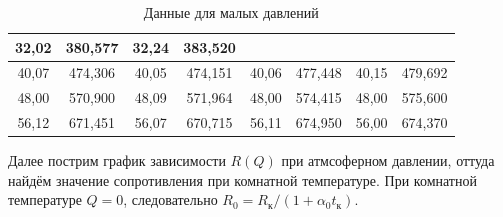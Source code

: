 \documentclass[a4paper,12pt]{article}
\begin{document}
\begin{table}[H]
\begin{tabular}{|cc|cc|cc|cc|}
          \multicolumn{1}{c|}{{\color[HTML]{000000} 32,02}} &
          {\color[HTML]{000000} 380,577} &
          \multicolumn{1}{c|}{{\color[HTML]{000000} 32,24}} &
          {\color[HTML]{000000} 383,520} \\ \hline
        \multicolumn{1}{|c|}{{\color[HTML]{000000} 40,07}} &
          {\color[HTML]{000000} 474,306} &
          \multicolumn{1}{c|}{{\color[HTML]{000000} 40,05}} &
          {\color[HTML]{000000} 474,151} &
          \multicolumn{1}{c|}{{\color[HTML]{000000} 40,06}} &
          {\color[HTML]{000000} 477,448} &
          \multicolumn{1}{c|}{{\color[HTML]{000000} 40,15}} &
          {\color[HTML]{000000} 479,692} \\ \hline
        \multicolumn{1}{|c|}{{\color[HTML]{000000} 48,00}} &
          {\color[HTML]{000000} 570,900} &
          \multicolumn{1}{c|}{{\color[HTML]{000000} 48,09}} &
          {\color[HTML]{000000} 571,964} &
          \multicolumn{1}{c|}{{\color[HTML]{000000} 48,00}} &
          {\color[HTML]{000000} 574,415} &
          \multicolumn{1}{c|}{{\color[HTML]{000000} 48,00}} &
          {\color[HTML]{000000} 575,600} \\ \hline
        \multicolumn{1}{|c|}{{\color[HTML]{000000} 56,12}} &
          {\color[HTML]{000000} 671,451} &
          \multicolumn{1}{c|}{{\color[HTML]{000000} 56,07}} &
          {\color[HTML]{000000} 670,715} &
          \multicolumn{1}{c|}{{\color[HTML]{000000} 56,11}} &
          {\color[HTML]{000000} 674,950} &
          \multicolumn{1}{c|}{{\color[HTML]{000000} 56,00}} &
          {\color[HTML]{000000} 674,370} \\ \hline
    \end{tabular}
    \caption*{Данные для малых давлений}
\end{table}
\newpage
Далее пострим график зависимости $R(Q)$ при атмсоферном давлении, оттуда найдём значение сопротивления при комнатной температуре. При комнатной температуре $Q = 0$, следовательно $R_0 = R_{к} / (1 + \alpha_0 t_{к})$.
\end{document}
